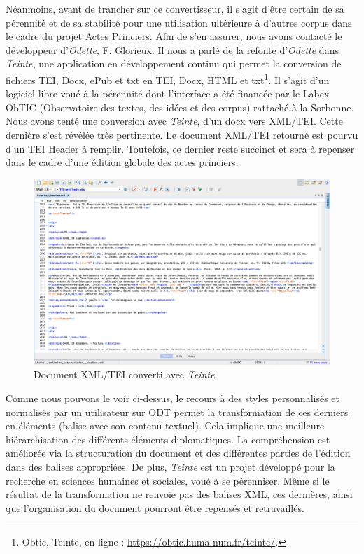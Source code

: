 \newpage 

\par Néanmoins, avant de trancher sur ce convertisseur, il s’agit d’être certain de sa pérennité et de sa stabilité pour une utilisation ultérieure à d’autres corpus dans le cadre du projet Actes Princiers. Afin de s’en assurer, nous avons contacté le développeur d'\textit{Odette}, F. Glorieux. Il nous a parlé de la refonte d'\textit{Odette} dans \textit{Teinte}, une application en développement continu qui permet la conversion de fichiers TEI, Docx, ePub et txt en TEI, Docx, HTML et txt\footnote{Obtic, Teinte, en ligne : \url{https://obtic.huma-num.fr/teinte/}.}. Il s’agit d’un logiciel libre voué à la pérennité dont l'interface a été financée par le Labex ObTIC (Observatoire des textes, des idées et des corpus) rattaché à la Sorbonne. Nous avons tenté une conversion avec \textit{Teinte}, d’un docx vers XML/TEI. Cette dernière s’est révélée très pertinente. Le document XML/TEI retourné est pourvu d’un TEI Header à remplir. Toutefois, ce dernier reste succinct et sera à repenser dans le cadre d’une édition globale des actes princiers. 

\begin{figure}[ht!]
    \centering
    \includegraphics[scale=0.31]{img/teinte.png}
    \caption{Document XML/TEI converti avec \textit{Teinte}.}
    \label{fig:teinte}
\end{figure}

\par Comme nous pouvons le voir ci-dessus, le recours à des styles personnalisés et normalisés par un utilisateur sur ODT permet la transformation de ces derniers en éléments (balise avec son contenu textuel). Cela implique une meilleure hiérarchisation des différents éléments diplomatiques. La compréhension est améliorée via la structuration du document et des différentes parties de l'édition dans des balises appropriées. De plus, \textit{Teinte} est un projet développé pour la recherche en sciences humaines et sociales, voué à se pérenniser. Même si le résultat de la transformation ne renvoie pas des balises XML, ces dernières, ainsi que l'organisation du document pourront être repensés et retravaillés. 

\newpage
\thispagestyle{empty}
\mbox{}
\newpage